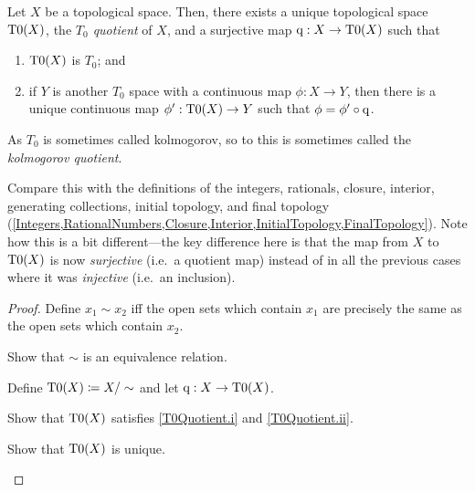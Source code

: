 \begin{prp}[$T_0$ quotient]\label{T0Quotient}
Let $X$ be a topological space.  Then, there exists a unique topological space $\operatorname{T0} (X)$, the \emph{$T_0$ quotient} of $X$, and a surjective map $\mathrm{q} :X\rightarrow \operatorname{T0} (X)$ such that
\begin{enumerate}
\item \label{T0Quotient.i}$\operatorname{T0} (X)$ is $T_0$; and
\item \label{T0Quotient.ii}if $Y$ is another $T_0$ space with a continuous map $\phi :X\rightarrow Y$, then there is a unique continuous map $\phi ':\operatorname{T0} (X)\rightarrow Y$ such that $\phi =\phi '\circ \mathrm{q}$.
\end{enumerate}
\begin{rmk}
As $T_0$ is sometimes called kolmogorov, so to this is sometimes called the \emph{kolmogorov quotient}.
\end{rmk}
\begin{rmk}
Compare this with the definitions of the integers, rationals, closure, interior, generating collections, initial topology, and final topology (\cref{Integers,RationalNumbers,Closure,Interior,InitialTopology,FinalTopology}).  Note how this is a bit different---the key difference here is that the map from $X$ to $\operatorname{T0} (X)$ is now \emph{surjective} (i.e.~a quotient map) instead of in all the previous cases where it was \emph{injective} (i.e.~an inclusion).
\end{rmk}
\begin{proof}
Define $x_1\sim x_2$ iff the open sets which contain $x_1$ are precisely the same as the open sets which contain $x_2$.
\begin{exr}
Show that $\sim$ is an equivalence relation.
\end{exr}
Define $\operatorname{T0} (X)\coloneqq X/\sim$ and let $\mathrm{q} :X\rightarrow \operatorname{T0} (X)$.
\begin{exr}
Show that $\operatorname{T0} (X)$ satisfies \ref{T0Quotient.i} and \ref{T0Quotient.ii}.
\end{exr}
\begin{exr}
Show that $\operatorname{T0} (X)$ is unique.
\end{exr}
\end{proof}
\end{prp}
